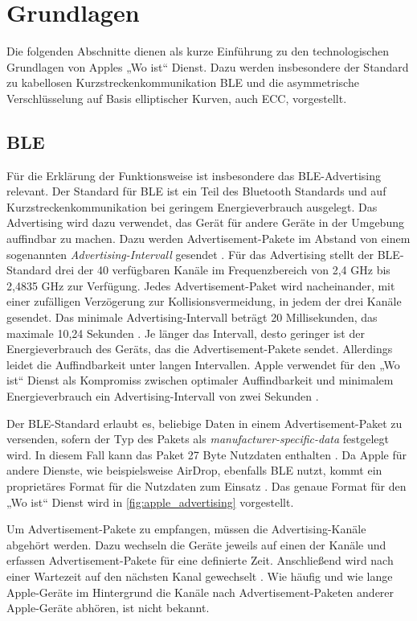 \section{Grundlagen}
\label{sec:grundlagen}

Die folgenden Abschnitte dienen als kurze Einführung zu den technologischen Grundlagen von Apples „Wo ist“ Dienst.
Dazu werden insbesondere der Standard zu kabellosen Kurzstreckenkommunikation \ac{BLE} und die asymmetrische Verschlüsselung auf Basis elliptischer Kurven, auch \ac{ECC}, vorgestellt.

\subsection{\acf{BLE}}
\label{sec:ble}
Für die Erklärung der Funktionsweise ist insbesondere das \ac{BLE}-Advertising relevant.
Der Standard für \ac{BLE} ist ein Teil des Bluetooth Standards und auf Kurzstreckenkommunikation bei geringem Energieverbrauch ausgelegt.
Das Advertising wird dazu verwendet, das Gerät für andere Geräte in der Umgebung auffindbar zu machen.
Dazu werden Advertisement-Pakete im Abstand von einem sogenannten \textit{Advertising-Intervall} gesendet \cite{Spec_BLE_5.3}.
Für das Advertising stellt der \ac{BLE}-Standard drei der 40 verfügbaren Kanäle im Frequenzbereich von 2,4 GHz bis 2,4835 GHz zur Verfügung.
Jedes Advertisement-Paket wird nacheinander, mit einer zufälligen Verzögerung zur Kollisionsvermeidung, in jedem der drei Kanäle gesendet.
Das minimale Advertising-Intervall beträgt 20 Millisekunden, das maximale 10,24 Sekunden \cite{Spec_BLE_5.3}.
Je länger das Intervall, desto geringer ist der Energieverbrauch des Geräts, das die Advertisement-Pakete sendet.
Allerdings leidet die Auffindbarkeit unter langen Intervallen.
Apple verwendet für den „Wo ist“ Dienst als Kompromiss zwischen optimaler Auffindbarkeit und minimalem Energieverbrauch ein Advertising-Intervall von zwei Sekunden \cite{Apple_FindMySpec}.


Der \ac{BLE}-Standard erlaubt es, beliebige Daten in einem Advertisement-Paket zu versenden, sofern der Typ des Pakets als \textit{manufacturer-specific-data} festgelegt wird.
In diesem Fall kann das Paket 27 Byte Nutzdaten enthalten \cite{Spec_BLE_5.3}.
Da Apple für andere Dienste, wie beispielsweise AirDrop, ebenfalls \ac{BLE} nutzt, kommt ein proprietäres Format für die Nutzdaten zum Einsatz \cite{Heinrich_FindMy}.
Das genaue Format für den „Wo ist“ Dienst wird in \autoref{fig:apple_advertising} vorgestellt.

Um Advertisement-Pakete zu empfangen, müssen die Advertising-Kanäle abgehört werden.
Dazu wechseln die Geräte jeweils auf einen der Kanäle und erfassen Advertisement-Pakete für eine definierte Zeit.
Anschließend wird nach einer Wartezeit auf den nächsten Kanal gewechselt \cite{Spec_BLE_5.3}.
Wie häufig und wie lange Apple-Geräte im Hintergrund die Kanäle nach Advertisement-Paketen anderer Apple-Geräte abhören, ist nicht bekannt.


